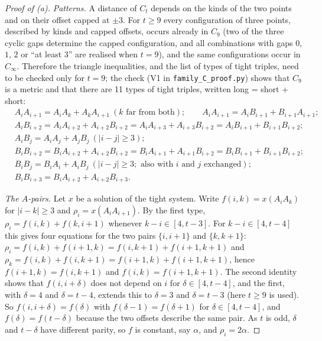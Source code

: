 \documentclass[11pt,a4paper]{article}
\theoremstyle{definition}
\theoremstyle{remark}
\newcommand{\file}[1]{\texttt{#1}}
\newcommand{\step}[1]{\smallskip\noindent\emph{#1}}
\begin{document}
\begin{proof}[Proof of (a)]
\step{Patterns.} A distance of $C_t$ depends on the kinds of the two points and on their offset capped at $\pm 3$.
For $t \ge 9$ every configuration of three points, described by kinds and capped offsets, occurs already in $C_9$
(two of the three cyclic gaps determine the capped configuration, and all combinations with gaps $0$, $1$, $2$ or
``at least 3'' are realised when $t = 9$), and the same configurations occur in $C_\infty$. Therefore the triangle
inequalities, and the list of types of tight triples, need to be checked only for $t = 9$; the check (V1 in
\file{family\_C\_proof.py}) shows that $C_9$ is a metric and that there are 11 types of tight triples, written
long = short + short:
\begin{align*}
& A_iA_{i+1} = A_iA_k + A_kA_{i+1}\ (k \text{ far from both}); \qquad A_iA_{i+1} = A_iB_{i+1} + B_{i+1}A_{i+1};\\
& A_iB_{i+2} = A_iA_{i+2} + A_{i+2}B_{i+2} = A_iA_{i+3} + A_{i+3}B_{i+2} = A_iB_{i+1} + B_{i+1}B_{i+2};\\
& A_iB_j = A_iA_j + A_jB_j\ (|i - j| \ge 3);\\
& B_iB_{i+2} = B_iA_{i+2} + A_{i+2}B_{i+2} = B_iA_{i+1} + A_{i+1}B_{i+2} = B_iB_{i+1} + B_{i+1}B_{i+2};\\
& B_iB_j = B_iA_i + A_iB_j\ (|i - j| \ge 3;\text{ also with $i$ and $j$ exchanged});\\
& B_iB_{i+3} = B_iA_{i+2} + A_{i+2}B_{i+3}.
\end{align*}

\step{The $A$-pairs.} Let $x$ be a solution of the tight system. Write $f(i, k) = x(A_iA_k)$ for $|i - k| \ge 3$ and
$\rho_i = x(A_iA_{i+1})$. By the first type, $\rho_i = f(i, k) + f(k, i + 1)$ whenever $k - i \in [4, t - 3]$. For
$k - i \in [4, t - 4]$ this gives four equations for the two pairs $\{i, i+1\}$ and $\{k, k+1\}$:
$\rho_i = f(i,k) + f(i+1,k) = f(i,k+1) + f(i+1,k+1)$ and $\rho_k = f(i,k) + f(i,k+1) = f(i+1,k) + f(i+1,k+1)$, hence
$f(i+1, k) = f(i, k+1)$ and $f(i, k) = f(i+1, k+1)$. The second identity shows that $f(i, i + \delta)$ does not
depend on $i$ for $\delta \in [4, t - 4]$, and the first, with $\delta = 4$ and $\delta = t - 4$, extends this to
$\delta = 3$ and $\delta = t - 3$ (here $t \ge 9$ is used). So $f(i, i + \delta) = f(\delta)$ with
$f(\delta - 1) = f(\delta + 1)$ for $\delta \in [4, t - 4]$, and $f(\delta) = f(t - \delta)$ because the two offsets
describe the same pair. As $t$ is odd, $\delta$ and $t - \delta$ have different parity, so $f$ is constant, say
$\alpha$, and $\rho_i = 2\alpha$.


\end{proof}
\end{document}
